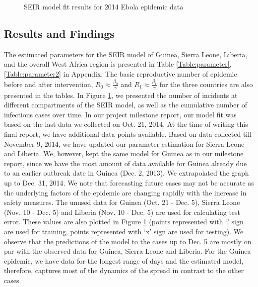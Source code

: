 \documentclass[10pt, journal,onecolumn]{IEEEtran}
\begin{document}
\begin{figure}[ht]
\quad
{}

\caption{SEIR model fit results for 2014 Ebola epidemic data}
\label{Fig:figurePrediction}
\end{figure}


\subsection{Results and Findings} The estimated parameters for the SEIR model of Guinea, Sierra
Leone, Liberia, and the overall West Africa region is presented in Table \ref{Table:parameter},
\ref{Table:parameter2} in Appendix. The basic reproductive number of epidemic before and after
intervention, $R_0 \approx \frac{\beta_0}{\gamma}$  and $R_1 \approx \frac{\beta_1}{\gamma}$ for the
three countries are also presented in the tables. In Figure \ref{Fig:figurePrediction}, we presented
the number of incidents at different compartments of the SEIR model, as well as the cumulative
number of infectious cases over time. In our project milestone report, our model fit was based on
the last data we collected on Oct. 21, 2014. At the time of writing this final report, we have
additional data points available. Based on data collected till November 9, 2014, we have updated our
parameter estimation for Sierra Leone and Liberia. We, however, kept the same model for Guinea as in
our milestone report, since we have the most amount of data available for Guinea already due to an
earlier outbreak date in Guinea (Dec. 2, 2013). We extrapolated the graph up to Dec. 31, 2014.  We
note that forecasting future cases may not be accurate as the underlying factors of the epidemic are
changing rapidly with the increase in safety measures. The unused data for Guinea (Oct. 21 - Dec.
5), Sierra Leone (Nov. 10 - Dec. 5) and Liberia (Nov. 10 - Dec. 5) are used for calculating test
error. These values are also plotted in Figure \ref{Fig:figurePrediction} (points represented with
`.' sign are used for training, points represented with `x' sign are used for testing). We observe
that the predictions of the model to the cases up to Dec. 5 are mostly on par with the observed data
for Guinea, Sierra Leone and Liberia. For the Guinea epidemic, we have data for the longest range of
days and the estimated model, therefore, captures most of the dynamics of the spread in contrast to
the other cases.
\end{document}
